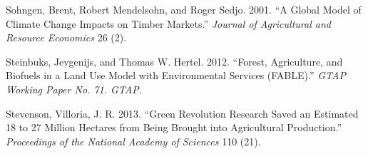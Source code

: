 \documentclass[
]{article}
\newlength{\cslhangindent}
\newlength{\cslentryspacingunit} %
\newenvironment{CSLReferences}[2] %
 {%
  \setlength{\parindent}{0pt}
  \ifodd #1
  \let\oldpar\par
  \def\par{\hangindent=\cslhangindent\oldpar}
  \fi
  \setlength{\parskip}{#2\cslentryspacingunit}
 }%
 {}
\begin{document}
\begin{CSLReferences}{1}{0}
\leavevmode{}%
Sohngen, Brent, Robert Mendelsohn, and Roger Sedjo. 2001. {``A Global Model of Climate Change Impacts on Timber Markets.''} \emph{Journal of Agricultural and Resource Economics} 26 (2).

\leavevmode{}%
Steinbuks, Jevgenijs, and Thomas W. Hertel. 2012. {``Forest, Agriculture, and Biofuels in a Land Use Model with Environmental Services (FABLE).''} \emph{GTAP Working Paper No. 71. GTAP}.

\leavevmode{}%
Stevenson, Villoria, J. R. 2013. {``Green Revolution Research Saved an Estimated 18 to 27 Million Hectares from Being Brought into Agricultural Production.''} \emph{Proceedings of the National Academy of Sciences} 110 (21).

\end{CSLReferences}
\end{document}
